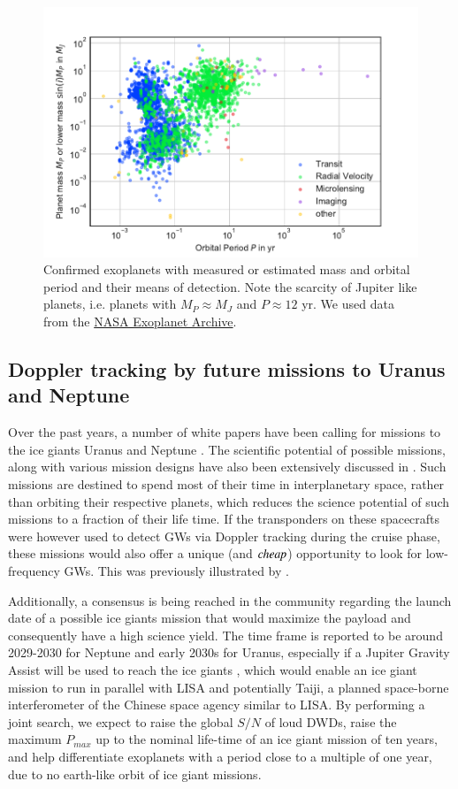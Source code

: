\documentclass{aa}
\newcommand{\TD}[1]{\textcolor{magenta}{\bf [To do] #1}}
\begin{document}
\begin{figure}[h]
    \centering
    \includegraphics[width=.5\textwidth]{exoplanets.pdf}
    \caption{Confirmed exoplanets with measured or estimated mass and orbital period and their means of detection. Note the scarcity of Jupiter like planets, i.e. planets with $M_P\approx M_J$ and $P \approx 12$ yr. We used data from the \href{https://exoplanetarchive.ipac.caltech.edu/}{NASA Exoplanet Archive}.}
    \label{fig:geometry}
\end{figure}

\subsection{Doppler tracking by future missions to Uranus and Neptune}


Over the past years, a number of white papers have been calling for missions to the ice giants Uranus and Neptune \citep{simon2020,abigail,whitepaper,whitepaper2,whitepaper3}. The scientific potential of possible missions, along with various mission designs have also been extensively discussed in \citep{hofstadter,fletcher,fletcher2,helled,quest,simon2020,kollmann}. Such missions are destined to spend most of their time in interplanetary space, rather than orbiting their respective planets, which reduces the science potential of such missions to a fraction of their life time. If the transponders on these spacecrafts were however used to detect GWs via Doppler tracking during the cruise phase, these missions would also offer a unique (and $\it{cheap}$) opportunity to look for low-frequency GWs. This was previously illustrated by \citep{soyuer2021}.

Additionally, a consensus is being reached in the community regarding the launch date of a possible ice giants mission that would maximize the payload and consequently have a high science yield. The time frame is reported to be around 2029-2030 for Neptune and early 2030s for Uranus, especially if a Jupiter Gravity Assist will be used to reach the ice giants \citep{hofstadter}, which would enable an ice giant mission to run in parallel with LISA and potentially Taiji, a planned space-borne interferometer of the Chinese space agency similar to LISA. By performing a joint search, we expect to raise the global $S/N$ of loud DWDs, raise the maximum $P_{max}$ up to the nominal life-time of an ice giant mission of ten years, and help differentiate exoplanets with a period close to a multiple of one year, due to no earth-like orbit of ice giant missions.
\end{document}
